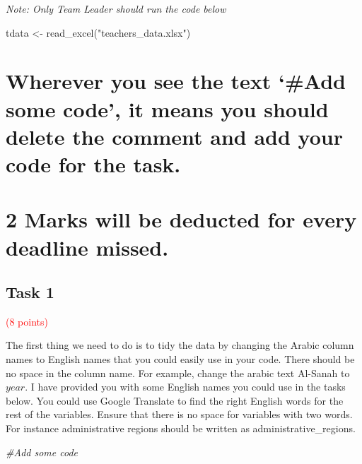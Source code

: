 \documentclass[
]{article}
\newenvironment{Shaded}{\begin{snugshade}}{\end{snugshade}}
\newcommand{\CommentTok}[1]{\textcolor[rgb]{0.56,0.35,0.01}{\textit{#1}}}
\newcommand{\FunctionTok}[1]{\textcolor[rgb]{0.00,0.00,0.00}{#1}}
\newcommand{\NormalTok}[1]{#1}
\newcommand{\OtherTok}[1]{\textcolor[rgb]{0.56,0.35,0.01}{#1}}
\newcommand{\StringTok}[1]{\textcolor[rgb]{0.31,0.60,0.02}{#1}}
\begin{document}
\emph{Note: Only Team Leader should run the code below}

\begin{Shaded}
\begin{Highlighting}[]
\NormalTok{tdata }\OtherTok{\textless{}{-}} \FunctionTok{read\_excel}\NormalTok{(}\StringTok{"teachers\_data.xlsx"}\NormalTok{)}
\end{Highlighting}
\end{Shaded}

\hypertarget{wherever-you-see-the-text-add-some-code-it-means-you-should-delete-the-comment-and-add-your-code-for-the-task.}{%
\section{Wherever you see the text `\#Add some code', it means you
should delete the comment and add your code for the
task.}\label{wherever-you-see-the-text-add-some-code-it-means-you-should-delete-the-comment-and-add-your-code-for-the-task.}}

\hypertarget{marks-will-be-deducted-for-every-deadline-missed.}{%
\section{2 Marks will be deducted for every deadline
missed.}\label{marks-will-be-deducted-for-every-deadline-missed.}}

\hypertarget{task-1}{%
\subsection{Task 1}\label{task-1}}

\textcolor{red}{(8 points)}

The first thing we need to do is to tidy the data by changing the Arabic
column names to English names that you could easily use in your code.
There should be no space in the column name. For example, change the
arabic text Al-Sanah to \(year\). I have provided you with some English
names you could use in the tasks below. You could use Google Translate
to find the right English words for the rest of the variables. Ensure
that there is no space for variables with two words. For instance
administrative regions should be written as administrative\_regions.

\begin{Shaded}
\begin{Highlighting}[]
\CommentTok{\#Add some code}
\end{Highlighting}
\end{Shaded}
\end{document}

